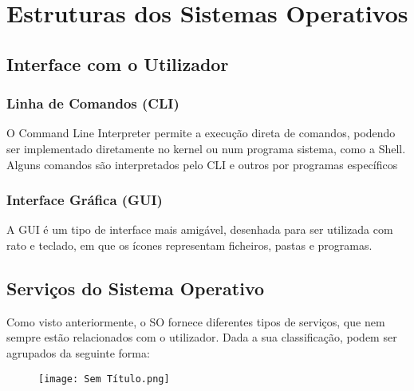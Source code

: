 \documentclass[10pt,a4paper]{report}
\begin{document}
\begin{comment}
\subsection{Time Sharing}
O time sharing consiste na combinação de multiprogramação com interação com o utilizador, o CPU comuta de job frequentemente, com tempos de resposta inferiores a 1 segundo.
\section{Tipos de Sistemas Operativos}
\begin{itemize}
\item Sistemas tempo-real
\item Sistemas interativos
\item Sistemas transacionais
\item Sistemas batch
\item Sistemas embebidos
\end{itemize}
\end{comment}

\chapter{Estruturas dos Sistemas Operativos}
\section{Interface com o Utilizador}
\subsection{Linha de Comandos (CLI)}
O Command Line Interpreter permite a execução direta de comandos, podendo ser implementado diretamente no kernel ou num programa sistema, como a Shell. Alguns comandos são interpretados pelo CLI e outros por programas específicos
\subsection{Interface Gráfica (GUI)}
A GUI é um tipo de interface mais amigável, desenhada para ser utilizada com rato e teclado, em que os ícones representam ficheiros, pastas e programas.
\section{Serviços do Sistema Operativo}
Como visto anteriormente, o SO fornece diferentes tipos de serviços, que nem sempre estão relacionados com o utilizador. Dada a sua classificação, podem ser agrupados da seguinte forma:
\begin{figure}[H]
\centering
\texttt{[image: Sem Título.png]}
\end{figure}
\end{document}

